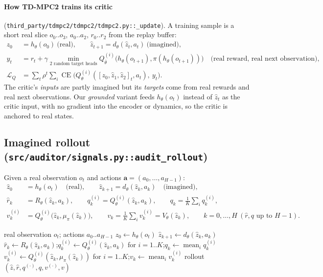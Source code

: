 \documentclass[11pt]{article}
\newcommand{\code}[1]{\texttt{#1}}
\begin{document}
\paragraph{How TD-MPC2 trains its critic} (\code{third\_party/tdmpc2/tdmpc2/tdmpc2.py::\_update}).
A training sample is a short real slice $o_0..o_3$, $a_0..a_2$, $r_0..r_2$ from the replay buffer:
\begin{align*}
z_0&=h_\theta(o_0)\ \text{(real)},\qquad \hat z_{t+1}=d_\theta(\hat z_t,a_t)\ \text{(imagined)},\\
y_t&=r_t+\gamma\min_{\text{2 random target heads}}Q^{(i)}_{\bar\theta}\bigl(h_\theta(o_{t+1}),\pi(h_\theta(o_{t+1}))\bigr)
\quad\text{(real reward, real next observation)},\\
\mathcal{L}_Q&=\sum_t\rho^t\sum_i\operatorname{CE}\bigl(Q^{(i)}_\theta([z_0,\hat z_1,\hat z_2]_t,a_t),\ y_t\bigr).
\end{align*}
The critic's \emph{inputs} are partly imagined but its \emph{targets} come from real rewards and real next
observations. Our \emph{grounded} variant feeds $h_\theta(o_t)$ instead of $\hat z_t$ as the critic input, with no
gradient into the encoder or dynamics, so the critic is anchored to real states.

\subsection{Imagined rollout (\code{src/auditor/signals.py::audit\_rollout})}

Given a real observation $o_t$ and actions $\mathbf a=(a_0,\dots,a_{H-1})$:
\begin{align*}
\hat z_0&=h_\theta(o_t)\quad\text{(real)},\qquad \hat z_{k+1}=d_\theta(\hat z_k,a_k)\quad\text{(imagined)},\\
\hat r_k&=R_\theta(\hat z_k,a_k),\qquad q^{(i)}_k=Q^{(i)}_\theta(\hat z_k,a_k),\qquad q_k=\tfrac1K\textstyle\sum_iq^{(i)}_k,\\
v^{(i)}_k&=Q^{(i)}_\theta\bigl(\hat z_k,\mu_\pi(\hat z_k)\bigr),\qquad v_k=\tfrac1K\textstyle\sum_iv^{(i)}_k=V_\theta(\hat z_k),
\qquad k=0,\dots,H \ (\text{$\hat r,q$ up to }H-1).
\end{align*}

\begin{algorithm}[h]
\caption{\textsc{Imagine}$(o_t,\mathbf a)$}\label{alg:imagine}
\begin{algorithmic}[1]
\Require real observation $o_t$; actions $a_0..a_{H-1}$
\State $\hat z_0\gets h_\theta(o_t)$ 
  \State $\hat z_{k+1}\gets d_\theta(\hat z_k,a_k)$
  \State $\hat r_k\gets R_\theta(\hat z_k,a_k)$;\quad $q^{(i)}_k\gets Q^{(i)}_\theta(\hat z_k,a_k)$ for $i=1..K$;\quad $q_k\gets\operatorname{mean}_i q^{(i)}_k$
\EndFor
{}
  \State $v^{(i)}_k\gets Q^{(i)}_\theta(\hat z_k,\mu_\pi(\hat z_k))$ for $i=1..K$;\quad $v_k\gets\operatorname{mean}_i v^{(i)}_k$
\EndFor
\State \Return rollout $(\hat z,\hat r,q^{(\cdot)},q,v^{(\cdot)},v)$
\end{algorithmic}
\end{algorithm}
\end{document}
